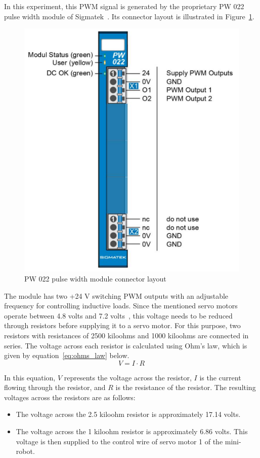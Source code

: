 \documentclass[MMR,Master,english]{twbook}
\begin{document}
\noindent In this experiment, this PWM signal is generated by the proprietary PW 022 pulse width module of Sigmatek~\cite{DigitalOutputSIGMATEK}. Its connector layout is illustrated in Figure~\ref{fig:pw022_connectors}.

\begin{figure}[H]
	\centering
	\includegraphics[width=0.5\columnwidth]{img/experiment/pw022_connectors.png}
	\caption[PW 022 pulse width module connector layout]{PW 022 pulse width module connector layout~\cite{DigitalOutputSIGMATEK}}
	\label{fig:pw022_connectors}
\end{figure}

\noindent The module has two +24 V switching PWM outputs with an adjustable frequency for controlling inductive loads. Since the mentioned servo motors operate between 4.8 volts and 7.2 volts~\cite{MG996RServoMotor}, this voltage needs to be reduced through resistors before supplying it to a servo motor. For this purpose, two resistors with resistances of 2500 kiloohms and 1000 kiloohms are connected in series. The voltage across each resistor is calculated using Ohm's law, which is given by equation~\ref{eq:ohms_law} below.
\begin{equation}
	\label{eq:ohms_law}
	V = I \cdot R
\end{equation}

\noindent In this equation, \(V\) represents the voltage across the resistor, \(I\) is the current flowing through the resistor, and \(R\) is the resistance of the resistor. The resulting voltages across the resistors are as follows:

\begin{itemize}
	\item The voltage across the 2.5 kiloohm resistor is approximately 17.14 volts.
	\item The voltage across the 1 kiloohm resistor is approximately 6.86 volts. This voltage is then supplied to the control wire of servo motor 1 of the mini-robot.
\end{itemize}
\end{document}
